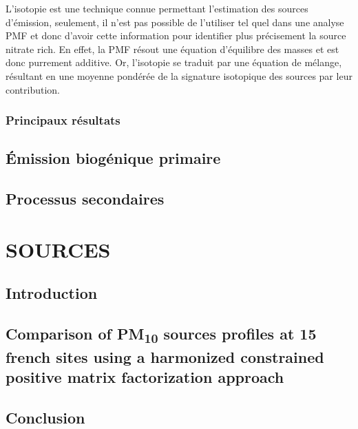 L'isotopie est une technique connue permettant l'estimation des sources d'émission,
seulement, il n'est pas possible de l'utiliser tel quel dans une analyse PMF et donc
d'avoir cette information pour identifier plus précisement la source nitrate rich.
En effet, la PMF résout une équation d'équilibre des masses et est donc purrement
additive. Or, l'isotopie se traduit par une équation de mélange, résultant en une moyenne
pondérée de la signature isotopique des sources par leur contribution.

\subsubsection{Principaux résultats}%
\label{ssub:principaux_résultats}


\subsection{Émission biogénique primaire}%
\label{sub:émission_biogénique_primaire}

\subsection{Processus secondaires}%
\label{sub:processus_secondaires}

\section{SOURCES}%
\label{sec:sources}

\subsection{Introduction}

\subsection{Comparison of PM\textsubscript{10} sources profiles at 15 french sites using a harmonized constrained positive matrix factorization approach}%
\label{sub:article}

\subsection{Conclusion}%
\label{sub:conclusion}



% 

